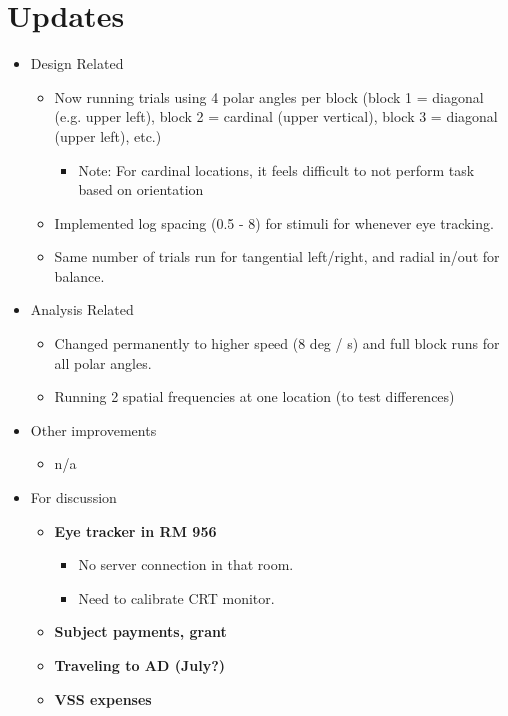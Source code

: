 \documentclass[11pt]{article} %
\begin{document}
\newpage
\section{Updates} 
\begin{itemize}
\item Design Related
	\begin{itemize}
	\item Now running trials using 4 polar angles per block (block 1 = diagonal (e.g. upper left), block 2 = cardinal (upper vertical), block 3 = diagonal (upper left), etc.)
		\begin{itemize}
			\item{Note: For cardinal locations, it feels difficult to not perform task based on orientation}
		\end{itemize}
	\item Implemented log spacing (0.5 - 8) for stimuli for whenever eye tracking.
	\item Same number of trials run for tangential left/right, and radial in/out for balance.
	\end{itemize}
\item Analysis Related
	\begin{itemize}
	\item Changed permanently to higher speed (8 deg / s) and full block runs for all polar angles.
	\item Running 2 spatial frequencies at one location (to test differences)
	\end{itemize}
\item Other improvements
	\begin{itemize}
	\item n/a
	\end{itemize}
\item For discussion
	\begin{itemize}
	\item \textbf{Eye tracker in RM 956}
		\begin{itemize}
			\item{No server connection in that room.}
			\item{Need to calibrate CRT monitor.}
		\end{itemize}
	\item \textbf{Subject payments, grant}
	\item \textbf{Traveling to AD (July?)}
	\item \textbf{VSS expenses}
	\end{itemize}
\end{itemize}
\end{document}
